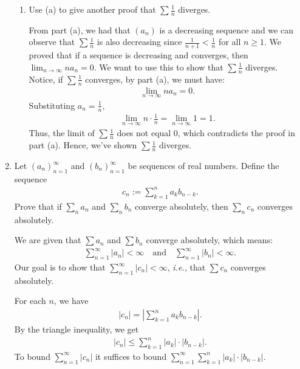 \documentclass [10pt]{article}
\newcommand{\jg}[1]{{\color{blue} #1}}
\begin{document}
\begin{enumerate}
\begin{enumerate}
\item Use (a) to give another proof that $\sum \frac{1}{n}$ diverges.

\jg{
From part (a), we had that $(a_n)$ is a decreasing sequence and we can observe that $\sum \frac{1}{n}$ is also decreasing since $\frac{1}{n+1} < \frac{1}{n}$ for all $n \geq 1$. We proved that if a sequence is decreasing and converges, then $\lim_{n\rightarrow \infty} n a_n = 0$. We want to use this to show that $\sum \frac{1}{n}$ diverges. Notice, if $\sum \frac{1}{n}$ converges, by part (a), we must have: 
\begin{align*}
    \lim_{n\rightarrow \infty} n a_n = 0. 
\end{align*}
Substituting $a_n = \frac{1}{n}$, 
\begin{align*}
    \lim_{n\rightarrow \infty} n \cdot \frac{1}{n} = \lim_{n\rightarrow \infty} 1 = 1. 
\end{align*}
Thus, the limit of $\sum \frac{1}{n}$ does not equal 0, which contradicts the proof in part (a). Hence, we've shown $\sum \frac{1}{n}$ diverges. 
}


\end{enumerate}
\clearpage



\item Let $(a_n)_{n=1}^{\infty}$ and $(b_n)_{n=1}^{\infty}$ be sequences of real
numbers. Define the sequence
\begin{align*}
c_n := \sum_{k=1}^n a_kb_{n-k}.
\end{align*}
Prove that if $\sum_n a_n$ and $\sum_n b_n$ converge absolutely, then $\sum_n c_n$
converges absolutely.


\jg{
We are given that $\sum a_n$ and $\sum b_n$ converge absolutely, which means: 
\begin{align*}
    \sum_{n=1}^\infty |a_n| < \infty \quad \text{and} \quad \sum_{n=1}^\infty |b_n| < \infty. 
\end{align*}
Our goal is to show that $\sum_{n=1}^\infty |c_n| < \infty$, \textit{i.e.,} that $\sum c_n$ converges absolutely. 

For each $n$, we have 
\begin{align*}
    |c_n| = \left|\sum_{k=1}^n a_kb_{n-k}\right|.
\end{align*}
By the triangle inequality, we get
\begin{align*}
    |c_n| \leq \sum_{k=1}^n |a_k| \cdot |b_{n-k}|. 
\end{align*}
To bound $\sum_{n=1}^\infty |c_n|$ it suffices to bound $\sum_{n=1}^\infty \sum_{k=1}^n |a_k| \cdot |b_{n-k}|$. 

}
\end{enumerate}
\end{document}
